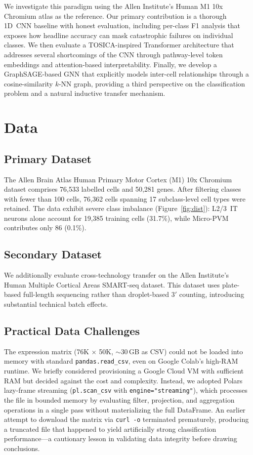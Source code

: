 \documentclass[11pt,letterpaper]{article}
\begin{document}
We investigate this paradigm using the Allen Institute's Human M1 10x Chromium
atlas as the reference. Our primary contribution is a thorough 1D~CNN baseline
with honest evaluation, including per-class F1 analysis that exposes how
headline accuracy can mask catastrophic failures on individual classes. We then
evaluate a TOSICA-inspired Transformer architecture that addresses several
shortcomings of the CNN through pathway-level token embeddings and
attention-based interpretability. Finally, we develop a GraphSAGE-based GNN
that explicitly models inter-cell relationships through a cosine-similarity
$k$-NN graph, providing a third perspective on the classification problem and
a natural inductive transfer mechanism.

\section{Data}

\subsection{Primary Dataset}
The Allen Brain Atlas Human Primary Motor Cortex (M1) 10x Chromium dataset
comprises 76,533 labelled cells and 50,281 genes. After filtering classes with
fewer than 100 cells, 76,362 cells spanning 17 subclass-level cell types were
retained. The data exhibit severe class imbalance (Figure~\ref{fig:dist}):
L2/3~IT neurons alone account for 19,385 training cells (31.7\%), while
Micro-PVM contributes only 86 (0.1\%).

\subsection{Secondary Dataset}
We additionally evaluate cross-technology transfer on the Allen Institute's
Human Multiple Cortical Areas SMART-seq dataset. This dataset uses plate-based
full-length sequencing rather than droplet-based 3$'$ counting, introducing
substantial technical batch effects.

\subsection{Practical Data Challenges}
The expression matrix (76K $\times$ 50K, ${\sim}$30\,GB as CSV) could not be
loaded into memory with standard \texttt{pandas.read\_csv}, even on Google
Colab's high-RAM runtime. We briefly considered provisioning a Google Cloud VM
with sufficient RAM but decided against the cost and complexity. Instead, we
adopted Polars lazy-frame streaming (\texttt{pl.scan\_csv} with
\texttt{engine="streaming"}), which processes the file in bounded memory by
evaluating filter, projection, and aggregation operations in a single pass
without materializing the full DataFrame. An earlier attempt to download the
matrix via \texttt{curl~-o} terminated prematurely, producing a truncated file
that happened to yield artificially strong classification performance---a
cautionary lesson in validating data integrity before drawing conclusions.
\end{document}
